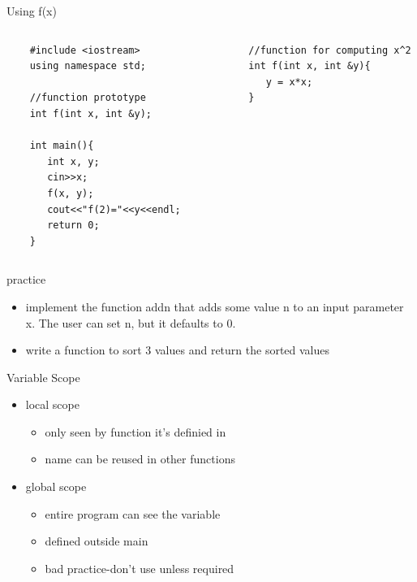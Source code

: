 \documentclass[xcolor={dvipsnames}]{beamer}
\begin{document}
\begin{frame}[fragile]{Using f(x)}
	\begin{columns}
	 \begin{column}{.49\textwidth}
	\begin{verbatim}
	#include <iostream>
	using namespace std;
		
	//function prototype
	int f(int x, int &y);

	int main(){
	   int x, y;
	   cin>>x;
	   f(x, y);
	   cout<<"f(2)="<<y<<endl;
	   return 0;
	}
	\end{verbatim}
	\end{column}
	\pause
	\begin{column}{.49\textwidth}
		\begin{verbatim}
		//function for computing x^2
		int f(int x, int &y){
		   y = x*x;
		}   
		\end{verbatim}
	\end{column}
	\end{columns}
\end{frame}

\begin{frame}{practice}
	\begin{itemize}
		\item implement the function addn that adds some value n to an input parameter x. The user can set n, but it defaults to 0.
		\item write a function to sort 3 values and return the sorted values
	\end{itemize}
\end{frame}


\begin{frame}{Variable Scope}
	\begin{itemize}
		\item local scope
		\begin{itemize}
			\item only seen by function it's definied in
			\item name can be reused in other functions
		\end{itemize}
		\item global scope
		\begin{itemize}
			\item entire program can see the variable
			\item defined outside main
			\item bad practice-don't use unless required
		\end{itemize}
	\end{itemize}
\end{frame}
\end{document}
